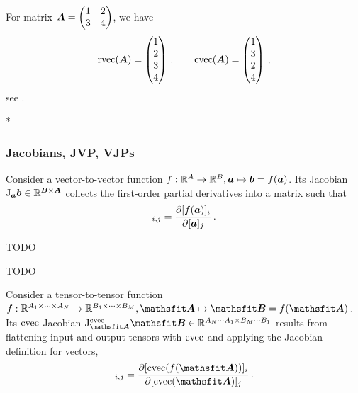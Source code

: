 \begin{paracol}{2}
  \begin{example}
    For matrix ${\bm{A}} = \begin{pmatrix} 1 & 2 \\ 3 & 4 \end{pmatrix} $, we have
    \begin{equation*}
      \operatorname{rvec}({\bm{A}})
      =
      \begin{pmatrix}
        1 \\ 2 \\ 3 \\ 4
      \end{pmatrix}\,,
      \qquad
      \operatorname{cvec}({\bm{A}})
      =
      \begin{pmatrix}
        1 \\ 3 \\ 2 \\ 4
      \end{pmatrix}\,,
    \end{equation*}
    see .
  \end{example}

  \switchcolumn[1]

  \switchcolumn[0]*
  \subsubsection{Jacobians, JVP, VJPs}

  \begin{definition}[Jacobian]
    Consider a vector-to-vector function $f: {\mathbb{R}}^A \to {\mathbb{R}}^B, {\bm{a}} \mapsto {\bm{b}} = f({\bm{a}})$.
    Its Jacobian $\mathrm{J}_{{\bm{a}}}{\bm{b}} \in {\mathbb{R}}^{{\bm{B}} \times {\bm{A}}}$ collects the first-order partial derivatives into a matrix such that
    \begin{align*}
      [\jac_{\va} \vb]_{i,j} = \frac{\partial [f(\va)]_i}{\partial [\va]_j}\,.
    \end{align*}
  \end{definition}

  \begin{definition}
    TODO
  \end{definition}

  \begin{definition}
    TODO
  \end{definition}

  \begin{definition}
    Consider a tensor-to-tensor function $f: \sR^{A_1 \times \dots \times A_N} \to \sR^{B_1 \times \dots \times B_M}, \tA \mapsto \tB = f(\tA)$. Its $\operatorname{cvec}$-Jacobian $\jac^{\cvec}_{\tA}\tB \in \sR^{A_N \cdots A_1 \times B_M \cdots B_1}$ results from flattening input and output tensors with $\operatorname{cvec}$ and applying the Jacobian definition for vectors,
    \begin{align*}
      [\jac^{\cvec}_{\tA}\tB]_{i,j}
      =
      \frac{\partial [\cvec(f(\tA))]_i}{\partial [\cvec(\tA)]_j}\,.
    \end{align*}
  \end{definition}


\end{paracol}
